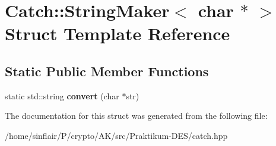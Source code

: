 \hypertarget{structCatch_1_1StringMaker_3_01char_01_5_01_4}{}\section{Catch\+:\+:String\+Maker$<$ char $\ast$ $>$ Struct Template Reference}
\label{structCatch_1_1StringMaker_3_01char_01_5_01_4}
\subsection*{Static Public Member Functions}
\begin{DoxyCompactItemize}
\item 
\mbox{\label{structCatch_1_1StringMaker_3_01char_01_5_01_4_a33049e24281ea6fba48bd8817bdd52bd}} 
static std\+::string {\bfseries convert} (char $\ast$str)
\end{DoxyCompactItemize}


The documentation for this struct was generated from the following file\+:\begin{DoxyCompactItemize}
\item 
/home/sinflair/\+P/crypto/\+A\+K/src/\+Praktikum-\/\+D\+E\+S/catch.\+hpp\end{DoxyCompactItemize}
